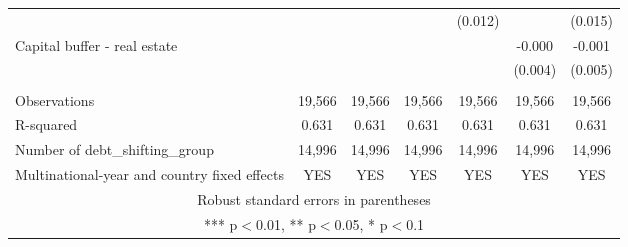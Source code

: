\begin{tabular}{lcccccc}
 &  &  &  & (0.012) &  & (0.015) \\
Capital buffer - real estate &  &  &  &  & -0.000 & -0.001 \\
 &  &  &  &  & (0.004) & (0.005) \\
 &  &  &  &  &  &  \\
Observations & 19,566 & 19,566 & 19,566 & 19,566 & 19,566 & 19,566 \\
R-squared & 0.631 & 0.631 & 0.631 & 0.631 & 0.631 & 0.631 \\
Number of debt\_shifting\_group & 14,996 & 14,996 & 14,996 & 14,996 & 14,996 & 14,996 \\
 Multinational-year and country fixed effects & YES & YES & YES & YES & YES & YES \\ \hline
\multicolumn{7}{c}{ Robust standard errors in parentheses} \\
\multicolumn{7}{c}{ *** p$<$0.01, ** p$<$0.05, * p$<$0.1} \\
\end{tabular}
